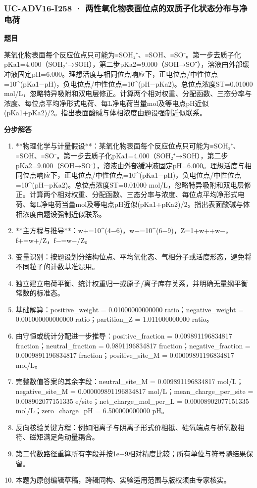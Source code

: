 \documentclass[UTF8,11pt,a4paper]{ctexart}
\begin{document}
\subsubsection*{UC-ADV16-I258 · 两性氧化物表面位点的双质子化状态分布与净电荷}
\noindent\textbf{题目}\par
某氧化物表面每个反应位点只可能为≡SOH₂⁺、≡SOH、≡SO⁻。第一步去质子化pKa1=4.000（SOH₂⁺→SOH），第二步pKa2=9.000（SOH→SO⁻），溶液由外部缓冲液固定pH=6.000。理想活度与相同位点响应下，正电位点/中性位点=10\textasciicircum{}(pKa1−pH)，负电位点/中性位点=10\textasciicircum{}(pH−pKa2)。总位点浓度ST=0.01000 mol/L，忽略特异吸附和双电层修正。计算两个相对权重、分配函数、三态分率与浓度、每位点平均净形式电荷、每L净电荷当量mol及等电点pH近似(pKa1+pKa2)/2。指出表面酸碱与体相浓度由题设强制近似联系。\par
\medskip\noindent\textbf{分步解答}
\begin{enumerate}
\item **物理化学与计量假设**：某氧化物表面每个反应位点只可能为≡SOH₂⁺、≡SOH、≡SO⁻。第一步去质子化pKa1=4.000（SOH₂⁺→SOH），第二步pKa2=9.000（SOH→SO⁻），溶液由外部缓冲液固定pH=6.000。理想活度与相同位点响应下，正电位点/中性位点=10\textasciicircum{}(pKa1−pH)，负电位点/中性位点=10\textasciicircum{}(pH−pKa2)。总位点浓度ST=0.01000 mol/L，忽略特异吸附和双电层修正。计算两个相对权重、分配函数、三态分率与浓度、每位点平均净形式电荷、每L净电荷当量mol及等电点pH近似(pKa1+pKa2)/2。指出表面酸碱与体相浓度由题设强制近似联系。
\item **主方程与推导**：w+=10\textasciicircum{}(4−6)，w−=10\textasciicircum{}(6−9)，Z=1+w++w−，f+=w+/Z，f−=w−/Z。
\item 变量识别：按题设划分结构位点、平均氧化态、气相分子或活度形态，避免将不同粒子的计数基准混用。
\item 独立建立电荷平衡、统计权重归一或原子/离子库存关系，并明确无量纲平衡常数的标准态。
\item 基础解算：positive\_weight = 0.01000000000000 ratio；negative\_weight = 0.001000000000000 ratio；partition\_Z = 1.011000000000 ratio。
\item 由守恒或统计分配进一步推导：positive\_fraction = 0.009891196834817 fraction；neutral\_fraction = 0.9891196834817 fraction；negative\_fraction = 0.0009891196834817 fraction；positive\_site\_M = 0.00009891196834817 mol/L。
\item 完整数值答案的其余字段：neutral\_site\_M = 0.009891196834817 mol/L；negative\_site\_M = 0.000009891196834817 mol/L；mean\_charge\_per\_site = 0.008902077151335 e/site；net\_charge\_mol\_per\_L = 0.00008902077151335 mol/L；zero\_charge\_pH = 6.500000000000 pH。
\item 反向核验关键方程：例如阳离子与阴离子形式价相抵、硅氧端点与桥氧数相符、磁矩满足角动量耦合。
\item 第二代数路径重算所有字段并按1e−9相对精度比较；所有单位与符号随结果保留。
\item 本题为原创编辑草稿，跨辑同构、实验适用范围与版权须由专家核实。
\end{enumerate}
\end{document}
